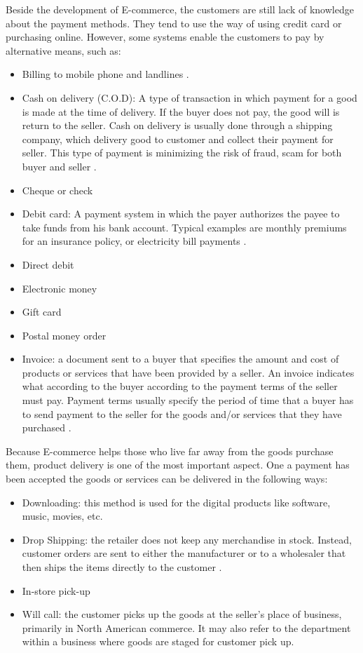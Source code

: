 \documentclass[conference]{IEEEtran}
\begin{document}
Beside the development of E-commerce, the customers are still lack of knowledge about the payment methods. They tend to use the way of using credit card or purchasing online. However, some systems enable the customers to pay by alternative means, such as:


\begin{itemize}
 \item Billing to mobile phone and landlines \cite{HowtoRunDropShip}.
  \item Cash on delivery (C.O.D): A type of transaction in which payment for a good is made at the time of delivery. If the buyer does not pay, the good will is return to the seller. Cash on delivery is usually done through a shipping company, which delivery good to customer and collect their payment for seller. This type of payment is minimizing the risk of fraud, scam for both buyer and seller \cite{cod2015}.
  \item Cheque or check
  \item Debit card: A payment system in which the payer authorizes the payee to take funds from his bank account. Typical examples are monthly premiums for an insurance policy, or electricity bill payments \cite{directdebit2015}.
  \item Direct debit
  \item Electronic money
  \item Gift card
  \item Postal money order
  \item Invoice: a document sent to a buyer that specifies the amount and cost of products or services that have been provided by a seller. An invoice indicates what according to the buyer according to the payment terms of the seller must pay. Payment terms usually specify the period of time that a buyer has to send payment to the seller for the goods and/or services that they have purchased \cite{invoice2015}.
\end{itemize}

Because E-commerce helps those who live far away from the goods purchase them, product delivery is one of the most important aspect. One a payment has been accepted the goods or services can be delivered in the following ways:

\begin{itemize}
\item Downloading: this method is used for the digital products like software, music, movies, etc.
\item Drop Shipping: the retailer does not keep any merchandise in stock. Instead, customer orders are sent to either the manufacturer or to a wholesaler that then ships the items directly to the customer
\cite{HowtoRunDropShip}.
\item In-store pick-up 
\item Will call: the customer picks up the goods at the seller's place of business, primarily in North American commerce. It may also refer to the department within a business where goods are staged for customer pick up.
\end{itemize}
\end{document}
